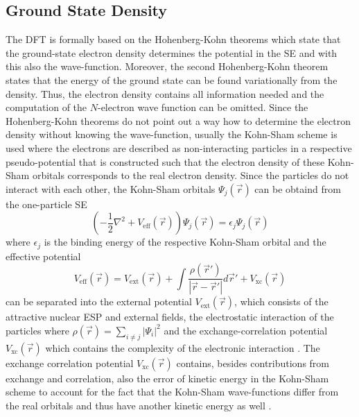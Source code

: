 \subsection{Ground State Density}
\label{ch:dft}
The DFT is formally based on the Hohenberg-Kohn theorems \cite{HohenbergKohn} which state that the ground-state electron density determines the potential in the SE and with this also the wave-function.
Moreover, the second Hohenberg-Kohn theorem states that the energy of the ground state can be found variationally from the density.
Thus, the electron density contains all information needed and the computation of the $N$-electron wave function can be omitted.
Since the Hohenberg-Kohn theorems do not point out a way how to determine the electron density without knowing the wave-function, usually the Kohn-Sham scheme \cite{KohnSham} is used where the electrons are described as non-interacting particles in a respective pseudo-potential that is constructed such that the electron density of these Kohn-Sham orbitals corresponds to the real electron density.
Since the particles do not interact with each other, the Kohn-Sham orbitals $\Psi_j(\vec{r})$ can be obtaind from the one-particle SE
\begin{equation}
\left( -\frac 12  \nabla^2 + V_\text{eff}(\vec{r}) \right) \Psi_j(\vec{r})=\epsilon_j \Psi_j(\vec{r})
\end{equation}
where $\epsilon_j$ is the binding energy of the respective Kohn-Sham orbital and the effective potential 
\begin{equation}
V_\text{eff}(\vec{r})=V_\text{ext}(\vec{r})+ \int \frac{\rho(\vec{r}')}{|\vec{r}-\vec{r}'|} d\vec{r}' + V_\text{xc}(\vec{r})
\end{equation}
can be separated into the external potential $V_\text{ext}(\vec{r})$, which consists of the attractive nuclear ESP and external fields, the electrostatic interaction of the particles where $\rho(\vec{r})=\sum_{i\neq j} |\Psi_i|^2$ and the exchange-correlation potential $V_\text{xc}(\vec{r})$ which contains the complexity of the electronic interaction \cite{baerRSH}.
The exchange correlation potential $V_\text{xc}(\vec{r})$ contains, besides contributions from exchange and correlation, also the error of kinetic energy in the Kohn-Sham scheme to account for the fact that the Kohn-Sham wave-functions differ from the real orbitals and thus have another kinetic energy as well \cite{Holthausen}.

